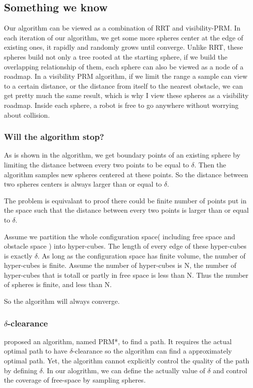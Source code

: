 \documentclass{article}
\begin{document}
	\subsection{Something we know}
                        Our algorithm can be viewed as a combination of RRT and visibility-PRM. In each iteration of our algorithm, we get some more spheres center at the edge of existing ones, it rapidly and randomly grows until converge. Unlike RRT, these spheres build not only a tree rooted at the starting sphere, if we build the overlapping relationship of them, each sphere can also be viewed as a node of a roadmap. In a visibility PRM algorithm, if we limit the range a sample can view to a certain distance, or the distance from itself to the nearest obstacle, we can get pretty much the same result, which is why I view these spheres as a visibility roadmap. Inside each sphere, a robot is free to go anywhere without worrying about collision. 

		\subsubsection{Will the algorithm stop?}
 			\label{Finite number of spheres}
 			As is shown in the algorithm, we get boundary points of an existing sphere by limiting the distance between every two points to be equal to $\delta$. Then the algorithm samples new spheres centered at these points. So the distance between two spheres centers is always larger than or equal to $\delta$. 

 			The problem is equivalant to proof there could be finite number of points put in the space such that the distance between every two points is larger than or equal to $\delta$.

 			Assume we partition the whole configuration space( including free space and obstacle space ) into hyper-cubes. The length of every edge of these hyper-cubes is exactly $\delta$. As long as the configuration space has finite volume, the number of hyper-cubes is finite. Assume the number of hyper-cubes is N, the number of hyper-cubes that is totall or partly in free space is less than N. Thus the number of spheres is finite, and less than N.

 			So the algorithm will always converge.	

 		\subsubsection{$\delta$-clearance}
 			\cite{Karaman2011} proposed an algorithm, named PRM*, to find a path. It requires the actual optimal path to have $\delta$-clearance so the algorithm can find a approximately optimal path. Yet, the algorithm cannot explicitly control the quality of the path by defining $\delta$. In our alogrithm, we can define the actually value of $\delta$ and control the coverage of free-space by sampling spheres. 
\end{document}
